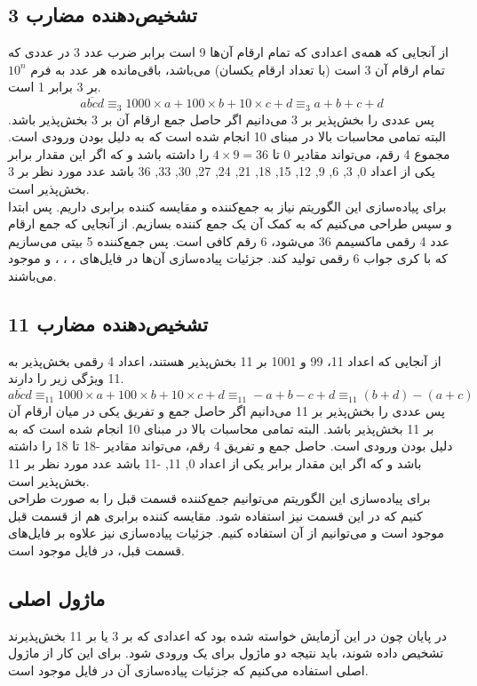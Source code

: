 \documentclass[fleqn]{article}
\begin{document}
\subsection{تشخیص‌دهنده مضارب 3}
از آنجایی که همه‌ی اعدادی که تمام ارقام آن‌ها 9 است برابر ضرب عدد 3 در عددی که 
تمام ارقام آن 3 است (با تعداد ارقام یکسان) می‌باشد، باقی‌مانده هر عدد به فرم 
$10^n$ 
بر 3 برابر 1 است.
$$
\overline{abcd} \equiv_3 1000 \times a + 100 \times b + 10 \times c + d
\equiv_3 a + b + c + d
$$
پس عددی را بخش‌پذیر بر 3 می‌دانیم اگر حاصل جمع ارقام آن بر 3 بخش‌پذیر باشد. 
البته تمامی محاسبات بالا در مبنای 10 انجام شده است که به دلیل  بودن 
ورودی است. مجموع 4 رقم، می‌تواند مقادیر 0 تا $4\times9 = 36$ را داشته باشد و 
که اگر این مقدار برابر یکی از اعداد 0, 3, 6, 9, 12, 15, 18, 21, 24, 27, 30, 
33, 36 باشد عدد مورد نظر بر 3 بخش‌پذیر است.
\\
برای پیاده‌سازی این الگوریتم نیاز به جمع‌کننده و مقایسه کننده برابری داریم. 
پس ابتدا 
 و سپس  طراحی می‌کنیم که به کمک آن یک جمع کننده 
بسازیم. از آنجایی که جمع ارقام عدد 4 رقمی ماکسیمم 36 می‌شود، 6 رقم کافی است. 
پس جمع‌کننده 5 بیتی می‌سازیم که با کری جواب 6 رقمی تولید کند. جزئیات 
پیاده‌سازی آن‌ها در فایل‌های 
 ،  ، ،  و 
موجود می‌باشند. 

\subsection{تشخیص‌دهنده مضارب 11}
از آنجایی که اعداد 11، 99 و 1001 بر 11 بخش‌پذیر هستند، اعداد 4 رقمی بخش‌پذیر 
به 11 ویژگی زیر را دارند.
$$
\overline{abcd} \equiv_{11} 1000 \times a + 100 \times b + 10 \times c + d
\equiv_{11} -a + b - c + d \equiv_{11} (b+d) - (a+c)
$$
پس عددی را بخش‌پذیر بر 11 می‌دانیم اگر حاصل جمع و تفریق یکی در میان ارقام آن 
بر 11 بخش‌پذیر باشد. 
البته تمامی محاسبات بالا در مبنای 10 انجام شده است که به دلیل  بودن 
ورودی است. حاصل جمع و تفریق 4 رقم، می‌تواند مقادیر -18 تا 18 را داشته باشد و 
که اگر این مقدار برابر یکی از اعداد 0, 11, -11 باشد عدد مورد نظر بر 11 
بخش‌پذیر است.
\\
برای پیاده‌سازی این الگوریتم می‌توانیم جمع‌کننده قسمت قبل را به صورت 
طراحی کنیم که در این قسمت نیز استفاده شود. مقایسه کننده برابری هم از قسمت 
قبل موجود است و می‌توانیم از آن استفاده کنیم. جزئیات پیاده‌سازی نیز علاوه بر 
فایل‌های قسمت قبل، در فایل 
موجود است.

\subsection{ماژول اصلی}
در پایان چون در این آزمایش خواسته شده بود که اعدادی که بر 3 یا بر 11 
بخش‌پذیرند تشخیص داده شوند، باید نتیجه دو ماژول برای یک ورودی  شود. 
برای این کار از ماژول اصلی استفاده می‌کنیم که جزئیات پیاده‌سازی آن در فایل 
موجود است.
\end{document}
